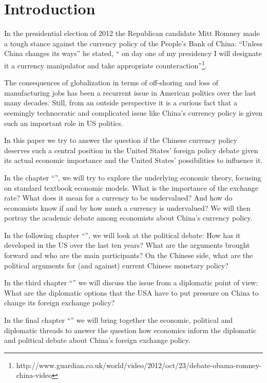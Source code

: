 \section{Introduction}
\label{sec:introduction}

In the presidential election of 2012 the Republican candidate Mitt 
Romney made a tough stance against the currency policy of the People's 
Bank of China: ``Unless China changes its ways'' he stated, `` on day 
one of my presidency I will designate it a currency manipulator and take 
appropriate 
counteraction''\footnote{http://www.guardian.co.uk/world/video/2012/oct/23/debate-obama-romney-china-video}.

The consequences of globalization in terms of off-shoring and loss of 
manufacturing jobs has been a recurrent issue in American politics over 
the last many decades. Still, from an outside perspective it is a 
curious fact that a seemingly technocratic and complicated issue like 
China's currency policy is given such an important role in US politics.  

In this paper we try to answer the question if the Chinese currency 
policy deserves such a central position in the United States' foreign 
policy debate given its actual economic importance and the United 
States' possibilities to influence it.


In the chapter ``'', we will try to explore the 
underlying economic theory, focusing on standard textbook economic 
models.  What is the importance of the exchange rate?  What does it mean 
for a currency to be undervalued? And how do economists know if and by 
how much a currency is undervalued? We will then portray the academic 
debate among economists about China's currency policy. 

In the following chapter ``'', we will look at the 
political debate: How has it developed in the US over the last ten 
years?  What are the arguments brought forward and who are the main 
participants? On the Chinese side, what are the political arguments for 
(and against) current Chinese monetary policy?  

In the third chapter ``'' we will discuss the 
issue from a diplomatic point of view: What are the diplomatic options 
that the USA have to put pressure on China to change its foreign 
exchange policy? 

In the final chapter ``'' we will bring together 
the economic, political and diplomatic threads to answer the question 
how economics inform the diplomatic and political debate about China's 
foreign exchange policy.
